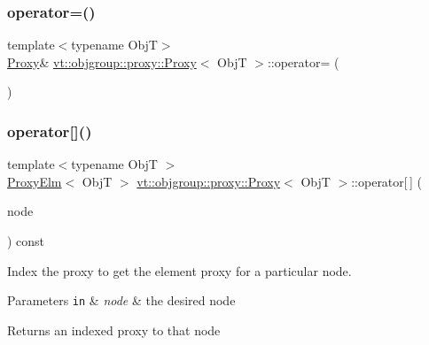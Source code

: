 \subsubsection{\texorpdfstring{operator=()}{operator=()}}
{\footnotesize\ttfamily template$<$typename ObjT$>$ \\
\hyperlink{structvt_1_1objgroup_1_1proxy_1_1_proxy}{Proxy}\& \hyperlink{structvt_1_1objgroup_1_1proxy_1_1_proxy}{vt\+::objgroup\+::proxy\+::\+Proxy}$<$ ObjT $>$\+::operator= (\begin{DoxyParamCaption}\item[{\hyperlink{structvt_1_1objgroup_1_1proxy_1_1_proxy}{Proxy}$<$ ObjT $>$ const \&}]{ }\end{DoxyParamCaption})\hspace{0.3cm}{\ttfamily [default]}}

\mbox{\label{structvt_1_1objgroup_1_1proxy_1_1_proxy_a00a267a8730fe2547776ff0136ea3895}} 
\subsubsection{\texorpdfstring{operator[]()}{operator[]()}}
{\footnotesize\ttfamily template$<$typename ObjT $>$ \\
\hyperlink{structvt_1_1objgroup_1_1proxy_1_1_proxy_elm}{Proxy\+Elm}$<$ ObjT $>$ \hyperlink{structvt_1_1objgroup_1_1proxy_1_1_proxy}{vt\+::objgroup\+::proxy\+::\+Proxy}$<$ ObjT $>$\+::operator\mbox{[}$\,$\mbox{]} (\begin{DoxyParamCaption}\item[{\hyperlink{namespacevt_a866da9d0efc19c0a1ce79e9e492f47e2}{Node\+Type}}]{node }\end{DoxyParamCaption}) const}



Index the proxy to get the element proxy for a particular node. 


\begin{DoxyParams}[1]{Parameters}
\mbox{\tt in}  & {\em node} & the desired node\\
\hline
\end{DoxyParams}
\begin{DoxyReturn}{Returns}
an indexed proxy to that node 
\end{DoxyReturn}
\mbox{\label{structvt_1_1objgroup_1_1proxy_1_1_proxy_addf812b8ec24f570f3796c78adc7b18d}} 
